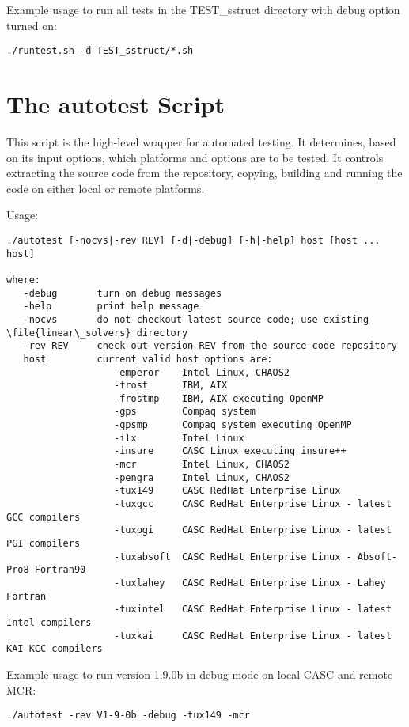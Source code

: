 Example usage to run all tests in the TEST\_sstruct directory with debug option turned on:
\begin{verbatim}
./runtest.sh -d TEST_sstruct/*.sh
\end{verbatim}

\section{The autotest Script}
\label{The autotest Script}

This script is the high-level wrapper for automated testing.  It determines, based 
on its input options, which platforms and options are to be tested.  It controls
extracting the source code from the repository, copying, building and running the
code on either local or remote platforms.

Usage:
\begin{verbatim}
./autotest [-nocvs|-rev REV] [-d|-debug] [-h|-help] host [host ... host]

where:
   -debug       turn on debug messages
   -help        print help message
   -nocvs       do not checkout latest source code; use existing \file{linear\_solvers} directory
   -rev REV     check out version REV from the source code repository
   host         current valid host options are:
                   -emperor    Intel Linux, CHAOS2
                   -frost      IBM, AIX
                   -frostmp    IBM, AIX executing OpenMP
                   -gps        Compaq system
                   -gpsmp      Compaq system executing OpenMP
                   -ilx        Intel Linux
                   -insure     CASC Linux executing insure++
                   -mcr        Intel Linux, CHAOS2
                   -pengra     Intel Linux, CHAOS2
                   -tux149     CASC RedHat Enterprise Linux
                   -tuxgcc     CASC RedHat Enterprise Linux - latest GCC compilers
                   -tuxpgi     CASC RedHat Enterprise Linux - latest PGI compilers
                   -tuxabsoft  CASC RedHat Enterprise Linux - Absoft-Pro8 Fortran90
                   -tuxlahey   CASC RedHat Enterprise Linux - Lahey Fortran
                   -tuxintel   CASC RedHat Enterprise Linux - latest Intel compilers
                   -tuxkai     CASC RedHat Enterprise Linux - latest KAI KCC compilers
\end{verbatim}

Example usage to run version 1.9.0b in debug mode on local CASC and remote MCR:
\begin{verbatim}
./autotest -rev V1-9-0b -debug -tux149 -mcr
\end{verbatim}
